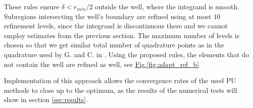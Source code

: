\documentclass{elsarticle}
\newcommand{\fig}[1]{\hyperref[#1]{Fig.\ref{#1}}}
\newcommand{\notePE}[1]{{\color{Orange} \textbf{PE: } \textit{#1}}}
\begin{document}
These rules ensure $\delta < r_{min}/2$ outside the well, where the integrand is smooth. Subregions intersecting 
the well's boundary are refined using at most $10$ refinement levels, since the integrand is discontinuous there and we cannot employ 
estimates from the previous section. The maximum number of levels is chosen so that we get similar total number of quadrature points 
as in the quadrature used by G. and C. in \cite{gracie_modelling_2010}. Using the proposed rules, the elements that do not contain the well are refined as well,
see \fig{fig:adapt_ref_b}. 

Implementation of this approach allows the convergence rates of the used PU methods to close up to the optimum,
as the results of the numerical tests will show in section \ref{sec:results}.


% 
% 
\end{document}
